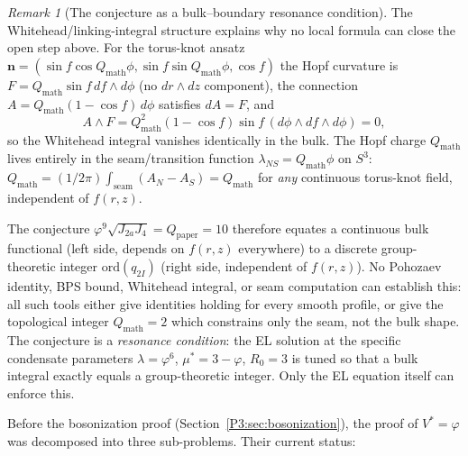 \documentclass[11pt,a4paper]{article}
\theoremstyle{definition}
\theoremstyle{remark}
\newtheorem{remark}[theorem]{Remark}
\newcommand{\vp}{\varphi}
\newcommand{\lam}{\lambda}
\newcommand{\ms}{\mu^{*}}
\newcommand{\Ja}{J_{2a}}
\newcommand{\Jfour}{J_{4}}
\begin{document}
\begin{remark}[The conjecture as a bulk--boundary resonance condition]
\label{P3:rem:resonance}
The Whitehead/linking-integral structure explains why no local formula
can close the open step above.
For the torus-knot ansatz
$\mathbf{n}=(\sin f\cos Q_{\mathrm{math}}\phi,\sin f\sin Q_{\mathrm{math}}\phi,\cos f)$
the Hopf curvature is $F=Q_{\mathrm{math}}\sin f\,df\wedge d\phi$
(no $dr\wedge dz$ component), the connection
$A=Q_{\mathrm{math}}(1-\cos f)\,d\phi$ satisfies $dA=F$, and
\begin{equation}
  A\wedge F = Q_{\mathrm{math}}^2(1-\cos f)\sin f\,(d\phi\wedge df\wedge d\phi) = 0,
\end{equation}
so the Whitehead integral vanishes identically in the bulk.
The Hopf charge $Q_{\mathrm{math}}$ lives entirely in the seam/transition
function $\lambda_{NS}=Q_{\mathrm{math}}\phi$ on $S^3$:
$Q_{\mathrm{math}}=(1/2\pi)\int_{\mathrm{seam}}(A_N-A_S)=Q_{\mathrm{math}}$
for \emph{any} continuous torus-knot field, independent of $f(r,z)$.

The conjecture
$\vp^9\sqrt{\Ja\Jfour}=Q_{\mathrm{paper}}=10$
therefore equates a continuous bulk functional (left side, depends on
$f(r,z)$ everywhere) to a discrete group-theoretic integer $\mathrm{ord}(q_{2I})$
(right side, independent of $f(r,z)$).
No Pohozaev identity, BPS bound, Whitehead integral, or seam computation
can establish this: all such tools either give identities holding for
every smooth profile, or give the topological integer
$Q_{\mathrm{math}}=2$ which constrains only the seam, not the bulk shape.
The conjecture is a \emph{resonance condition}: the EL solution at the
specific condensate parameters $\lam=\vp^6$, $\ms=3-\vp$, $R_0=3$
is tuned so that a bulk integral exactly equals a group-theoretic integer.
Only the EL equation itself can enforce this.
\end{remark}

Before the bosonization proof (Section~\ref{P3:sec:bosonization}), the
proof of $V^*=\vp$ was decomposed into three sub-problems.  Their
current status:
\end{document}
